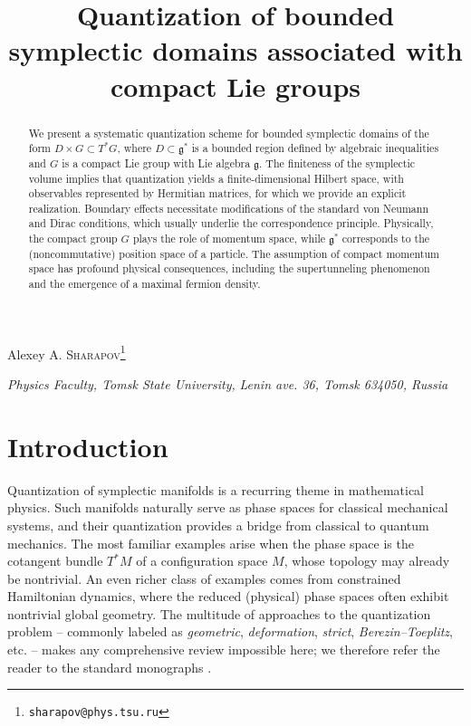 \documentclass[12pt,a4paper]{article}
\title{{\bf Quantization of bounded symplectic domains associated with compact Lie groups}}
\date{}
\numberwithin{equation}{section}
\theoremstyle{theorem}
\theoremstyle{remark}
\begin{document}
\maketitle

\begin{center}
\textheight
\renewcommand{\thefootnote}{\fnsymbol{footnote}}
  Alexey A. \textsc{Sharapov}\footnote{{\tt sharapov@phys.tsu.ru}} 
\renewcommand{\thefootnote}{\arabic{footnote}}
\setcounter{footnote}{0}


\end{center}
\begin{center}
\emph{Physics Faculty, Tomsk State University,}
\emph{Lenin ave. 36, Tomsk
634050, Russia}
\end{center}

\vspace{5mm}


\begin{abstract}
We present a systematic quantization scheme for bounded symplectic domains of the form 
\(D \times G \subset T^\ast G\), where \(D \subset \mathfrak{g}^\ast\) is a bounded region defined by algebraic inequalities and \(G\) is a compact Lie group with Lie algebra \(\mathfrak{g}\).  
The finiteness of the  symplectic volume implies that quantization yields a finite-dimensional Hilbert space, with observables represented by Hermitian matrices, for which we provide an explicit realization.  
Boundary effects necessitate modifications of the standard von Neumann and Dirac conditions, which usually underlie the correspondence principle. Physically, the compact group $G$ plays the role of momentum space, while $\mathfrak{g}^\ast$
corresponds to the (noncommutative) position space of a particle.
The assumption of compact momentum space has profound physical consequences, including the supertunneling phenomenon and the emergence of a maximal fermion density.
\end{abstract}

 
\section{Introduction}


Quantization of symplectic manifolds is a recurring theme in mathematical physics. Such manifolds naturally serve as phase spaces for classical mechanical systems, and their quantization provides a bridge from classical to quantum mechanics. The most familiar examples arise when the phase space is the cotangent bundle $T^\ast M$ of a configuration space $M$, whose topology may already be nontrivial. An even richer class of examples comes from constrained Hamiltonian dynamics, where the reduced (physical) phase spaces often exhibit nontrivial global geometry. The multitude of approaches to the quantization problem -- commonly labeled as {\it geometric}, {\it deformation}, {\it strict}, {\it Berezin--Toeplitz},  etc. -- makes any comprehensive review impossible here; we therefore refer the reader to the standard monographs \cite{woodhouse1992geometric, KM, fedosov1995deformation,landsman2012mathematical,floch2018brief}.
\end{document}
